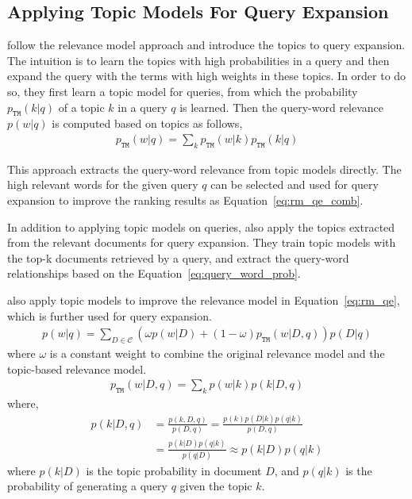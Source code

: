 \subsection{Applying Topic Models For Query Expansion}

\cite{Yi-2009} follow the relevance model approach and introduce the topics to query expansion. The intuition is to learn the topics with high probabilities in a query and then expand the query with the terms with high weights in these topics. In order to do so, they first learn a topic model for queries, from which the probability $p_{\texttt{TM}}(k|q)$ of a topic $k$ in a query $q$ is learned. Then the query-word relevance $p(w|q)$ is computed based on topics as follows,
\begin{align}
\label{eq:query_word_prob}
p_{\texttt{TM}}(w|q) = \sum_k p_{\texttt{TM}}(w|k) p_{\texttt{TM}}(k|q)
\end{align}

This approach extracts the query-word relevance from topic models directly. The high relevant words for the given query $q$ can be selected and used for query expansion to improve the ranking results as Equation~\ref{eq:rm_qe_comb}.

In addition to applying topic models on queries, \cite{Yi-2009} also apply the topics extracted from the relevant documents for query expansion. They train topic models with the top-k documents retrieved by a query, and extract the query-word relationships based on the Equation~\ref{eq:query_word_prob}.

\cite{Yi-2009} also apply topic models to improve the relevance model in Equation~\ref{eq:rm_qe}, which is further used for query expansion. 
\begin{align}
p(w|q) = \sum_{D \in \mathcal{C}} (\omega p(w|D) + (1 - \omega)p_{\texttt{TM}}(w|D,q))p(D|q)
\end{align}
where $\omega$ is a constant weight to combine the original relevance model and the topic-based relevance model. 
\begin{align}
p_{\texttt{TM}}(w|D,q) = \sum_k p(w|k) p(k|D,q)
\end{align}
where,
\begin{align}
p(k|D,q) &= \frac{p(k,D,q)}{p(D,q)}  = \frac{p(k)p(D|k)p(q|k)}{p(D,q)} \\
&= \frac{p(k|D)p(q|k)}{p(q|D)} \approx p(k|D)p(q|k)
\end{align}
where $p(k|D)$ is the topic probability in document $D$, and $p(q|k)$ is the probability of generating a query $q$ given the topic $k$. 

